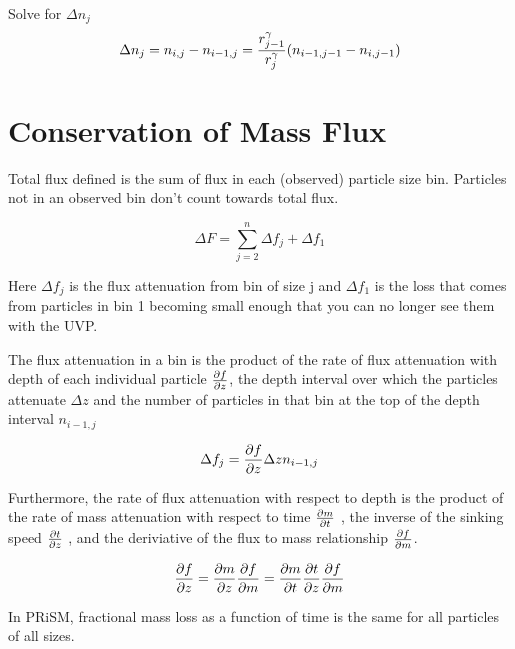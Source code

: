 \documentclass[a4paper,12pt]{article}
\begin{document}
Solve for $\Delta n_j$
 \begin{equation}
\Delta n_j = n_{i, j} - n_{i-1, j} = {{r^\gamma_{j-1}}\over{r^\gamma_{j}}} (n_{i-1,j-1}-n_{i,j-1})
 \end{equation}

\section{Conservation of Mass Flux}

Total flux defined is the sum of flux in each (observed) particle size bin. Particles not in an observed bin don't count towards total flux.

\begin{equation}
\Delta F = \sum_{j = 2}^n \Delta f_j + \Delta f_1
\label{eqn:df}
\end{equation}

Here $\Delta f_j$ is the flux attenuation from bin of size j and $\Delta f_1$ is the loss that comes from particles in bin 1 becoming small enough that you can no longer see them with the UVP.

The flux attenuation in a bin is the product of the rate of flux attenuation with depth of each individual particle ${\partial f} \over {\partial z}$, the depth interval over which the particles attenuate $\Delta z$ and the number of particles in that bin at the top of the depth interval $n_{i-1,j}$

\begin{equation}
\Delta f_j = {{\partial f} \over {\partial z}} \Delta z n_{i-1,j}
\label{eqn:dfj}
\end{equation}

Furthermore, the rate of flux attenuation with respect to depth is the product of the rate of mass attenuation with respect to time ${{\partial m} \over {\partial t}}$ , the inverse of the sinking speed ${{\partial t} \over {\partial z}}$ , and the deriviative of the flux to mass relationship ${{\partial f} \over {\partial m}}$.

\begin{equation}
{{\partial f} \over {\partial z}} = 
{{\partial m} \over {\partial z}} {{\partial f} \over {\partial m}} = 
{{\partial m} \over {\partial t}} 
{{\partial t} \over {\partial z}} 
{{\partial f} \over {\partial m}}
\label{eqn:dfdz}
\end{equation}

In PRiSM, fractional mass loss as a function of time is the same for all particles of all sizes.
\end{document}
